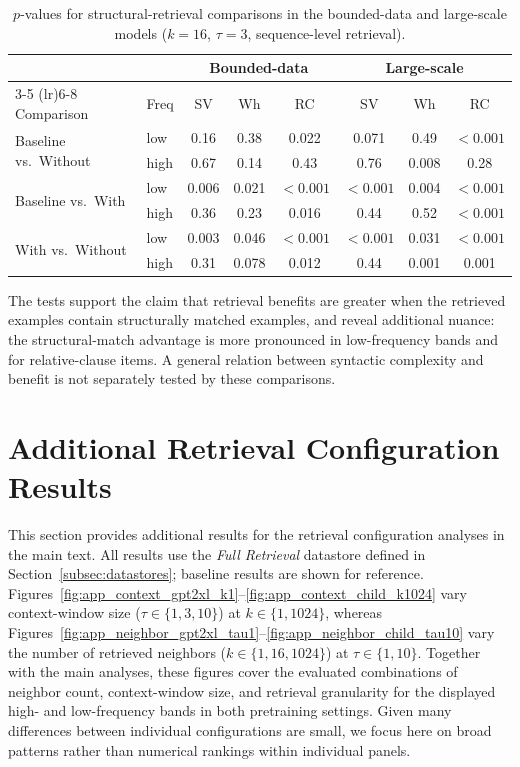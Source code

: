 \begin{table}[ht]
\centering
\small
\caption{$p$-values for structural-retrieval comparisons in the
bounded-data and large-scale models ($k=16$, $\tau=3$,
sequence-level retrieval).}
\label{tab:struc_ttests}
\begin{tabular}{llcccccc}
\toprule
& & \multicolumn{3}{c}{\textbf{Bounded-data}}
& \multicolumn{3}{c}{\textbf{Large-scale}} \\
\cmidrule(lr){3-5}
\cmidrule(lr){6-8}
Comparison & Freq & SV & Wh & RC & SV & Wh & RC \\
\midrule

\multirow{2}{*}{Baseline vs.\ Without}
& low  & 0.16 & 0.38 & 0.022
       & 0.071 & 0.49  & $<0.001$ \\
& high & 0.67 & 0.14 & 0.43
       & 0.76  & 0.008 & 0.28 \\

\multirow{2}{*}{Baseline vs.\ With}
& low  & 0.006 & 0.021 & $<0.001$
       & $<0.001$ & 0.004 & $<0.001$ \\
& high & 0.36 & 0.23 & 0.016
       & 0.44 & 0.52 & $<0.001$ \\

\multirow{2}{*}{With vs.\ Without}
& low  & 0.003 & 0.046 & $<0.001$
       & $<0.001$ & 0.031 & $<0.001$ \\
& high & 0.31 & 0.078 & 0.012
       & 0.44 & 0.001 & 0.001 \\

\bottomrule
\end{tabular}
\end{table}


\noindent The tests support the claim that retrieval benefits are greater when the retrieved examples contain structurally matched examples, and reveal additional nuance: the structural-match advantage is more pronounced in low-frequency bands and for relative-clause items. A general relation between syntactic complexity and benefit is not separately tested by these comparisons.


\section{Additional Retrieval Configuration Results}
\label{app:retrieval_config}

This section provides additional results for the retrieval configuration analyses in the main text. All results use the \textit{Full Retrieval} datastore defined in Section~\ref{subsec:datastores}; baseline results are shown for reference. Figures~\ref{fig:app_context_gpt2xl_k1}--\ref{fig:app_context_child_k1024} vary context-window size ($\tau \in \{1, 3, 10\}$) at $k \in \{1, 1024\}$, whereas Figures~\ref{fig:app_neighbor_gpt2xl_tau1}--\ref{fig:app_neighbor_child_tau10} vary the number of retrieved neighbors ($k \in \{1, 16, 1024\}$) at $\tau \in \{1, 10\}$. Together with the main analyses, these figures cover the evaluated combinations of neighbor count, context-window size, and retrieval granularity for the displayed high- and low-frequency bands in both pretraining settings. Given many differences between individual configurations are small, we focus here on broad patterns rather than numerical rankings within individual panels.


